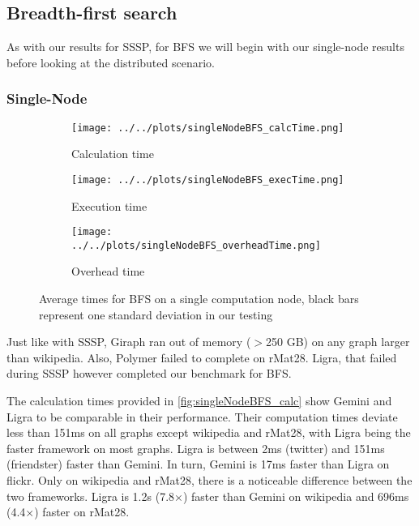 
\subsection{Breadth-first search}
As with our results for SSSP, for BFS we will begin with our single-node results before looking at the distributed scenario.
\subsubsection{Single-Node}
\begin{figure*}
	\begin{subfigure}{0.32\textwidth}
		\texttt{[image: ../../plots/singleNodeBFS\_calcTime.png]}
		\caption{Calculation time}
		\label{fig:singleNodeBFS_calc}
	\end{subfigure}
	\hfil
	\begin{subfigure}{0.32\textwidth}
		\texttt{[image: ../../plots/singleNodeBFS\_execTime.png]}
		\caption{Execution time}
		\label{fig:singleNodeBFS_exec}
	\end{subfigure}
	\hfil
	\begin{subfigure}{0.32\textwidth}
		\texttt{[image: ../../plots/singleNodeBFS\_overheadTime.png]}
		\caption{Overhead time}
		\label{fig:singleNodeBFS_overheadNormalized}
	\end{subfigure}
	\caption{Average times for BFS on a single computation node, black bars represent one standard deviation in our testing}
\end{figure*}
Just like with SSSP, Giraph ran out of memory ($>$250 GB) on any graph larger than wikipedia. Also, Polymer failed to complete on rMat28. Ligra, that failed during SSSP however completed our benchmark for BFS.

The calculation times provided in \autoref{fig:singleNodeBFS_calc} show Gemini and Ligra to be comparable in their performance. 
Their computation times deviate less than 151ms on all graphs except wikipedia and rMat28, with Ligra being the faster framework on most graphs.
Ligra is between 2ms (twitter) and 151ms (friendster) faster than Gemini.
In turn, Gemini is 17ms faster than Ligra on flickr.
Only on wikipedia and rMat28, there is a noticeable difference between the two frameworks. Ligra is 1.2s (7.8$\times$) faster than Gemini on wikipedia and 696ms (4.4$\times$) faster on rMat28.

